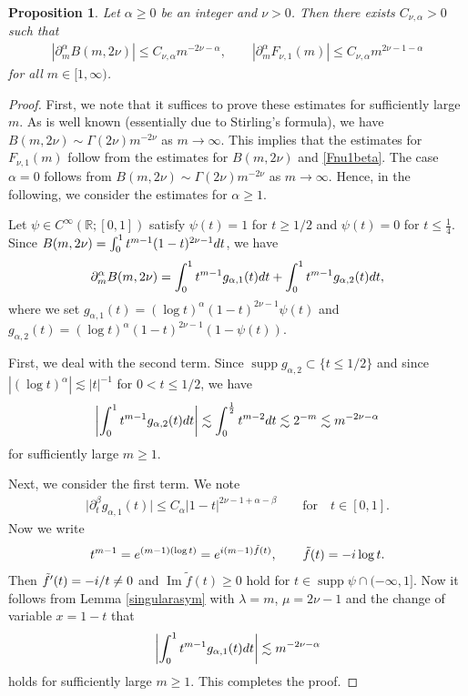\documentclass[10pt,a4paper]{article}
\numberwithin{equation}{section}
\newtheorem{Proposition}[Theorem]{Proposition}
 { \theoremstyle{definition}
\newtheorem{Definition}[Theorem]{Definition}
\newtheorem{Note}[Theorem]{Note}
\newtheorem{Example}[Theorem]{Example}
\newtheorem{Remark}[Theorem]{Remark} }
\def\R{\mathbb{R}}%
\DeclareMathOperator{\supp}{supp}%
\DeclareMathOperator{\im}{Im}%
\def\a{\alpha}
\def\b{\beta}
\def\g{\psi}
\def\l{\lambda}
\def\m{\mu}
\def\n{\nu}
\def\pa{\partial}
\begin{document}
\begin{Proposition}\label{Fnuestimate}
Let $\a\geq 0$ be an integer and $\n>0$. Then there exists $C_{\n,\a}>0$ such that
\begin{align*}
|\pa_m^{\a}B(m,2\n)|\leq C_{\n,\a}m^{-2\n-\a},\qquad |\pa_m^{\a}F_{\n,1}(m)|\leq C_{\n,\a}m^{2\n-1-\a}
\end{align*}
for all $m\in [1,\infty)$.
\end{Proposition}

\begin{proof}First, we note that it suffices to prove these estimates for sufficiently large $m$. As is well known (essentially due to Stirling's formula), we have $B(m,2\n)\sim \Gamma(2\n)m^{-2\n}$ as $m\to \infty$.
This implies that the estimates for $F_{\n,1}(m)$ follow from the estimates for $B(m,2\n)$ and \eqref{Fnu1beta}. The case $\a=0$ follows from $B(m,2\n)\sim \Gamma(2\n)m^{-2\n}$ as $m\to \infty$. Hence, in the following, we consider the estimates for $\a\geq 1$.

Let $\g\in C^{\infty}(\R;[0,1])$ satisfy $\g(t)=1$ for $t\geq 1/2$ and $\g(t)=0$ for $t\leq \frac{1}{4}$.
Since $B(m,2\n)=\int_0^1t^{m-1}(1-t)^{2\n-1}{\rm d}t$, we have
\begin{align*}
\pa_m^{\a}B(m,2\n)=\int_0^1t^{m-1}g_{\a,1}(t){\rm d}t+\int_0^1t^{m-1}g_{\a,2}(t){\rm d}t,
\end{align*}
where we set $g_{\a,1}(t)=(\log t)^{\a}(1-t)^{2\n-1}\g(t)$ and $g_{\a,2}(t)=(\log t)^{\a}(1-t)^{2\n-1}(1-\g(t))$.

First, we deal with the second term. Since $\supp g_{\a,2}\subset \{t\leq 1/2\}$ and since $|(\log t)^{\a}|\lesssim |t|^{-1}$ for $0<t\leq 1/2$, we have
\begin{align*}
\left|\int_0^1t^{m-1}g_{\a,2}(t){\rm d}t\right|\lesssim \int_0^{\frac{1}{2}}t^{m-2}{\rm d}t\lesssim 2^{-m}\lesssim m^{-2\n-\a}
\end{align*}
for sufficiently large $m\geq 1$.

Next, we consider the first term. We note
\begin{align*}
\big|\pa_{t}^{\b}g_{\a,1}(t)\big|\leq C_{\a}|1-t|^{2\n-1+\a-\b}\qquad\text{for}\quad t\in [0,1].
\end{align*}
Now we write
\begin{align*}
t^{m-1}={\rm e}^{(m-1)(\log t)}={\rm e}^{{\rm i}(m-1)\tilde{f}(t)},\qquad \tilde{f}(t)=-{\rm i}\log t.
\end{align*}
Then $\tilde{f}'(t)=-{\rm i}/t\neq 0$ and $\im \tilde{f}(t)\geq 0$ hold for $t\in \supp \g\cap (-\infty,1]$.
Now it follows from Lemma \ref{singularasym} with $\l=m$, $\m=2\n-1$ and the change of variable $x=1-t$ that
\begin{align*}
\left|\int_0^1t^{m-1}g_{\a,1}(t){\rm d}t\right|\lesssim m^{-2\n-\a}
\end{align*}
holds for sufficiently large $m\geq 1$. This completes the proof.
\end{proof}
\end{document}
